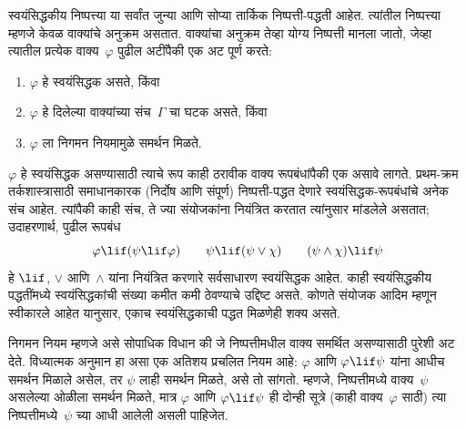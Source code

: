 स्वयंसिद्धकीय निष्पत्त्या या सर्वांत जुन्या आणि सोप्या तार्किक
निष्पत्ती-पद्धती आहेत. त्यांतील निष्पत्त्या म्हणजे केवळ
वाक्यांचे अनुक्रम असतात. वाक्यांचा अनुक्रम तेव्हा योग्य
निष्पत्ती मानला जातो, जेव्हा त्यातील प्रत्येक वाक्य~$\varphi$ पुढील
अटींपैकी एक अट पूर्ण करते:
\begin{enumerate}
\item $\varphi$ हे स्वयंसिद्धक असते, किंवा
\item $\varphi$ हे दिलेल्या वाक्यांच्या संच~$\Gamma$ चा घटक असते, किंवा
\item $\varphi$ ला निगमन नियमामुळे समर्थन मिळते.
\end{enumerate}
$\varphi$ हे स्वयंसिद्धक असण्यासाठी त्याचे रूप काही ठरावीक वाक्य
रूपबंधांपैकी एक असावे लागते. प्रथम-क्रम तर्कशास्त्रासाठी समाधानकारक
(निर्दोष आणि संपूर्ण) निष्पत्ती-पद्धत देणारे स्वयंसिद्धक-रूपबंधांचे
अनेक संच आहेत. त्यांपैकी काही संच, ते ज्या संयोजकांना नियंत्रित करतात
त्यांनुसार मांडलेले असतात; उदाहरणार्थ, पुढील रूपबंध
\[\varphi \lif (\psi \lif \varphi) \qquad \psi \lif (\psi \lor \chi) \qquad (\psi \land \chi) \lif \psi
\]
हे $\lif$, $\lor$ आणि~$\land$ यांना नियंत्रित करणारे सर्वसाधारण स्वयंसिद्धक
आहेत. काही स्वयंसिद्धकीय पद्धतींमध्ये स्वयंसिद्धकांची संख्या कमीत कमी
ठेवण्याचे उद्दिष्ट असते. कोणते संयोजक आदिम म्हणून स्वीकारले आहेत यानुसार,
एकाच स्वयंसिद्धकाची पद्धत मिळणेही शक्य असते.

निगमन नियम म्हणजे असे सोपाधिक विधान की जे निष्पत्तीमधील
वाक्य समर्थित असण्यासाठी पुरेशी अट देते. विध्यात्मक अनुमान हा असा
एक अतिशय प्रचलित नियम आहे: $\varphi$ आणि $\varphi \lif \psi$ यांना आधीच समर्थन मिळाले
असेल, तर $\psi$ लाही समर्थन मिळते, असे तो सांगतो. म्हणजे, निष्पत्तीमध्ये वाक्य~$\psi$ असलेल्या ओळीला समर्थन मिळते, मात्र $\varphi$ आणि
$\varphi \lif \psi$ ही दोन्ही सूत्रे (काही वाक्य~$\varphi$ साठी) त्या
निष्पत्तीमध्ये~$\psi$ च्या आधी आलेली असली पाहिजेत.

